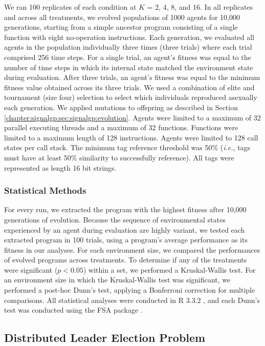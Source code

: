 We ran 100 replicates of each condition at $K$ = 2, 4, 8, and 16. 
In all replicates and across all treatments, we evolved populations of 1000 agents for 10,000 generations, starting from a simple ancestor program consisting of a single function with eight no-operation instructions. 
Each generation, we evaluated all agents in the population individually three times (three trials) where each trial comprised 256 time steps. 
For a single trial, an agent's fitness was equal to the number of time steps in which its internal state matched the environment state during evaluation. 
After three trials, an agent's fitness was equal to the minimum fitness value obtained across its three trials. 
We used a combination of elite and tournament (size four) selection to select which individuals reproduced asexually each generation. 
We applied mutations to offspring as described in Section \ref{chapter:signalgp:sec:signalgp:evolution}. 
Agents were limited to a maximum of 32 parallel executing threads and a maximum of 32 functions. 
Functions were limited to a maximum length of 128 instructions. 
Agents were limited to 128 call states per call stack. 
The minimum tag reference threshold was 50\% (\textit{i.e.}, tags must have at least 50\% similarity to successfully reference). 
All tags were represented as length 16 bit strings. 

\subsubsection{Statistical Methods}

For every run, we extracted the program with the highest fitness after 10,000 generations of evolution. 
Because the sequence of environmental states experienced by an agent during evaluation are highly variant, we tested each extracted program in 100 trials, using a program's average performance as its fitness in our analyses. 
For each environment size, we compared the performances of evolved programs across treatments. 
To determine if any of the treatments were significant ($p < 0.05$) within a set, we performed a Kruskal-Wallis test. 
For an environment size in which the Kruskal-Wallis test was significant, we performed a post-hoc Dunn's test, applying a Bonferroni correction for multiple comparisons. All statistical analyses were conducted in R 3.3.2 \citep{r_core_team_2016}, and each Dunn's test was conducted using the FSA package \citep{r_FSA_2017}.

\subsection{Distributed Leader Election Problem}

